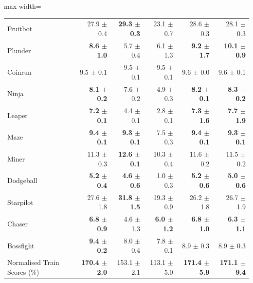 \begin{table}[H]
\begin{center}
\begin{small}
\begin{sc}
\begin{adjustbox}{max width=\linewidth}
\begin{tabular}{lrrrrr}
                    Fruitbot &           27.9 $\pm$ 0.4 & \textbf{29.3 $\pm$ 0.3} &         23.1 $\pm$ 0.7 &                    28.6 $\pm$ 0.3 &                    28.1 $\pm$ 0.3 \\
                     Plunder &   \textbf{8.6 $\pm$ 1.0} &           5.7 $\pm$ 0.4 &          6.1 $\pm$ 1.3 &            \textbf{9.2 $\pm$ 1.7} &           \textbf{10.1 $\pm$ 0.9} \\
                     Coinrun &            9.5 $\pm$ 0.1 &           9.5 $\pm$ 0.1 &          9.5 $\pm$ 0.1 &                     9.6 $\pm$ 0.0 &                     9.6 $\pm$ 0.1 \\
                       Ninja &   \textbf{8.1 $\pm$ 0.2} &           7.6 $\pm$ 0.2 &          4.9 $\pm$ 0.3 &            \textbf{8.2 $\pm$ 0.1} &            \textbf{8.3 $\pm$ 0.2} \\
                      Leaper &   \textbf{7.2 $\pm$ 0.1} &           4.4 $\pm$ 0.1 &          2.8 $\pm$ 0.1 &            \textbf{7.3 $\pm$ 1.6} &            \textbf{7.7 $\pm$ 1.9} \\
                        Maze &   \textbf{9.4 $\pm$ 0.1} &  \textbf{9.3 $\pm$ 0.1} &          7.5 $\pm$ 0.3 &            \textbf{9.4 $\pm$ 0.1} &            \textbf{9.3 $\pm$ 0.1} \\
                       Miner &           11.3 $\pm$ 0.3 & \textbf{12.6 $\pm$ 0.1} &         10.3 $\pm$ 0.4 &                    11.6 $\pm$ 0.2 &                    11.5 $\pm$ 0.2 \\
                   Dodgeball &   \textbf{5.2 $\pm$ 0.4} &  \textbf{4.6 $\pm$ 0.6} &          1.0 $\pm$ 0.3 &            \textbf{5.2 $\pm$ 0.6} &            \textbf{5.0 $\pm$ 0.6} \\
                   Starpilot &           27.6 $\pm$ 1.8 & \textbf{31.8 $\pm$ 1.5} &         19.3 $\pm$ 0.9 &                    26.2 $\pm$ 1.8 &                    26.7 $\pm$ 1.9 \\
                      Chaser &   \textbf{6.8 $\pm$ 0.9} &           4.6 $\pm$ 1.3 & \textbf{6.0 $\pm$ 1.2} &            \textbf{6.8 $\pm$ 1.0} &            \textbf{6.3 $\pm$ 1.1} \\
                   Bossfight &   \textbf{9.4 $\pm$ 0.2} &           8.0 $\pm$ 0.4 &          7.8 $\pm$ 0.1 &                     8.9 $\pm$ 0.3 &                     8.9 $\pm$ 0.3 \\
\midrule
Normalised Train Scores (\%) & \textbf{170.4 $\pm$ 2.0} &         153.1 $\pm$ 2.1 &        113.1 $\pm$ 5.0 &          \textbf{171.4 $\pm$ 5.9} &          \textbf{171.1 $\pm$ 9.4} \\
\bottomrule
\end{tabular}
\end{adjustbox}
\end{sc}
\end{small}
\end{center}
\vskip -0.1in
\end{table}

